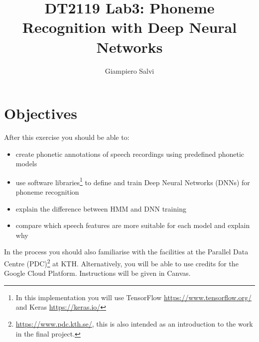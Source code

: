 \documentclass{nada-ten}
\author{Giampiero Salvi}
\title{DT2119 Lab3: Phoneme Recognition with Deep Neural Networks}
\begin{document}
\maketitle
\section{Objectives}
After this exercise you should be able to:
\begin{itemize}
\item create phonetic annotations of speech recordings using predefined phonetic models
\item use software libraries\footnote{In this implementation you will use TensorFlow \url{https://www.tensorflow.org/} and Keras \url{https://keras.io/}} to define and train Deep Neural Networks (DNNs) for phoneme recognition
\item explain the difference between HMM and DNN training
\item compare which speech features are more suitable for each model and explain why
\end{itemize}

In the process you should also familiarise with the facilities at the Parallel Data Centre (PDC)\footnote{\url{https://www.pdc.kth.se/}, this is also intended as an introduction to the work in the final project.} at KTH.
Alternatively, you will be able to use credits for the Google Cloud Platform. Instructions will be given in Canvas.
\end{document}
